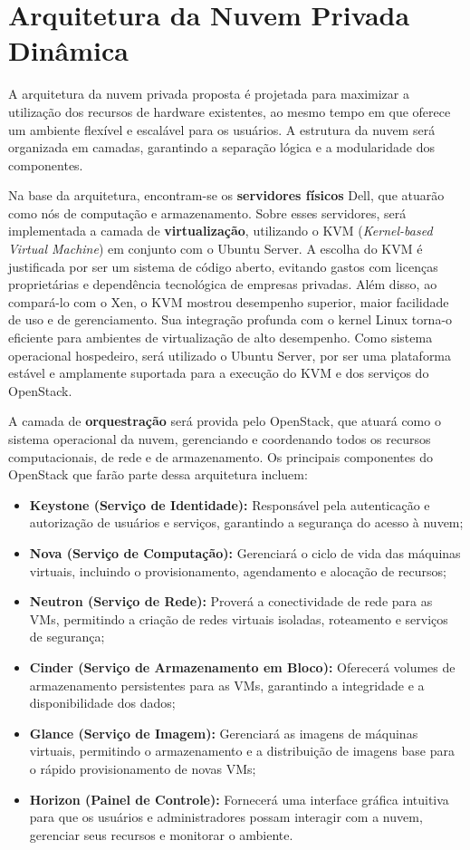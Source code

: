 \section{Arquitetura da Nuvem Privada Dinâmica}

A arquitetura da nuvem privada proposta é projetada para maximizar a utilização dos recursos de hardware existentes, ao mesmo tempo em que oferece um ambiente flexível e escalável para os usuários. A estrutura da nuvem será organizada em camadas, garantindo a separação lógica e a modularidade dos componentes.

Na base da arquitetura, encontram-se os \textbf{servidores físicos} Dell, que atuarão como nós de computação e armazenamento. Sobre esses servidores, será implementada a camada de \textbf{virtualização}, utilizando o KVM (\textit{Kernel-based Virtual Machine}) em conjunto com o Ubuntu Server. A escolha do KVM é justificada por ser um sistema de código aberto, evitando gastos com licenças proprietárias e dependência tecnológica de empresas privadas. Além disso, ao compará-lo com o Xen, o KVM mostrou desempenho superior, maior facilidade de uso e de gerenciamento. Sua integração profunda com o kernel Linux torna-o eficiente para ambientes de virtualização de alto desempenho. Como sistema operacional hospedeiro, será utilizado o Ubuntu Server, por ser uma plataforma estável e amplamente suportada para a execução do KVM e dos serviços do OpenStack.

A camada de \textbf{orquestração} será provida pelo OpenStack, que atuará como o sistema operacional da nuvem, gerenciando e coordenando todos os recursos computacionais, de rede e de armazenamento. Os principais componentes do OpenStack que farão parte dessa arquitetura incluem:

\begin{itemize}
 \item \textbf{Keystone (Serviço de Identidade):} Responsável pela autenticação e autorização de usuários e serviços, garantindo a segurança do acesso à nuvem;
 \item \textbf{Nova (Serviço de Computação):} Gerenciará o ciclo de vida das máquinas virtuais, incluindo o provisionamento, agendamento e alocação de recursos;
 \item \textbf{Neutron (Serviço de Rede):} Proverá a conectividade de rede para as VMs, permitindo a criação de redes virtuais isoladas, roteamento e serviços de segurança;
 \item \textbf{Cinder (Serviço de Armazenamento em Bloco):} Oferecerá volumes de armazenamento persistentes para as VMs, garantindo a integridade e a disponibilidade dos dados;
 \item \textbf{Glance (Serviço de Imagem):} Gerenciará as imagens de máquinas virtuais, permitindo o armazenamento e a distribuição de imagens base para o rápido provisionamento de novas VMs;
 \item \textbf{Horizon (Painel de Controle):} Fornecerá uma interface gráfica intuitiva para que os usuários e administradores possam interagir com a nuvem, gerenciar seus recursos e monitorar o ambiente.
\end{itemize}


